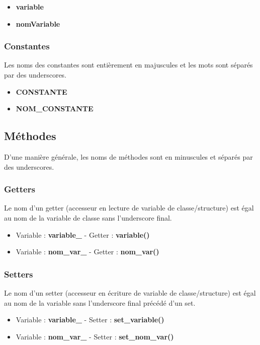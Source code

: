 \documentclass[]{article}
\begin{document}
\begin{itemize}
	\item \textbf{variable}
	\item \textbf{nomVariable}
\end{itemize}

\subsubsection{Constantes}

Les noms des constantes sont entièrement en majuscules et les mots sont
séparés par des underscores.

\begin{itemize}
	\item \textbf{CONSTANTE}
	\item \textbf{NOM\_CONSTANTE}
\end{itemize}

\subsection{Méthodes}

D'une manière générale, les noms de méthodes sont en minuscules et
séparés par des underscores.

\subsubsection{Getters}

Le nom d'un getter (accesseur en lecture de variable de classe/structure)
est égal au nom 
de la variable de classe sans l'underscore final.

\begin{itemize}
	\item Variable : \textbf{variable\_} - Getter : \textbf{variable()}
	\item Variable : \textbf{nom\_var\_} - Getter : \textbf{nom\_var()}
\end{itemize}

\subsubsection{Setters}

Le nom d'un setter (accesseur en écriture de variable de classe/structure)
est égal au nom de la variable sans l'underscore final précédé
d'un set.

\begin{itemize}
	\item Variable : \textbf{variable\_} - Setter : \textbf{set\_variable()}
	\item Variable : \textbf{nom\_var\_} - Setter : \textbf{set\_nom\_var()}
\end{itemize}
\end{document}
